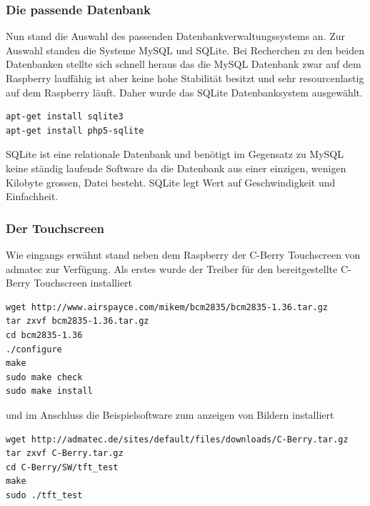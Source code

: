 \documentclass[11pt,a4paper]{article} %
\begin{document}
\subsubsection{Die passende Datenbank}
Nun stand die Auswahl des passenden Datenbankverwaltungssystems an. Zur Auswahl standen die Systeme MySQL und SQLite. Bei Recherchen zu den beiden Datenbanken stellte sich schnell heraus das die MySQL Datenbank zwar auf dem Raspberry lauffähig ist aber keine hohe Stabilität besitzt und sehr resourcenlastig auf dem Raspberry läuft. Daher wurde das SQLite Datenbanksystem ausgewählt.
\begin{frame}

\begin{lstlisting}
apt-get install sqlite3
apt-get install php5-sqlite
\end{lstlisting}

\end{frame}
 SQLite ist eine relationale Datenbank und benötigt im Gegensatz zu MySQL keine ständig laufende Software da die Datenbank aus einer einzigen, wenigen Kilobyte grossen, Datei besteht. SQLite  legt Wert auf Geschwindigkeit und Einfachheit.
\par
\subsubsection{Der Touchscreen}
Wie eingangs erwähnt stand neben dem Raspberry der C-Berry Touchscreen von admatec zur Verfügung. \cite{1}
Als erstes wurde der Treiber für den bereitgestellte C-Berry Touchscreen installiert \cite{5}
\begin{frame}

\begin{lstlisting}
wget http://www.airspayce.com/mikem/bcm2835/bcm2835-1.36.tar.gz
tar zxvf bcm2835-1.36.tar.gz
cd bcm2835-1.36
./configure
make
sudo make check
sudo make install
\end{lstlisting}

\end{frame}
und im Anschluss die Beispielsoftware zum anzeigen von Bildern installiert
\begin{frame}

\begin{lstlisting}
wget http://admatec.de/sites/default/files/downloads/C-Berry.tar.gz
tar zxvf C-Berry.tar.gz
cd C-Berry/SW/tft_test
make
sudo ./tft_test
\end{lstlisting}

\end{frame}
\end{document}

